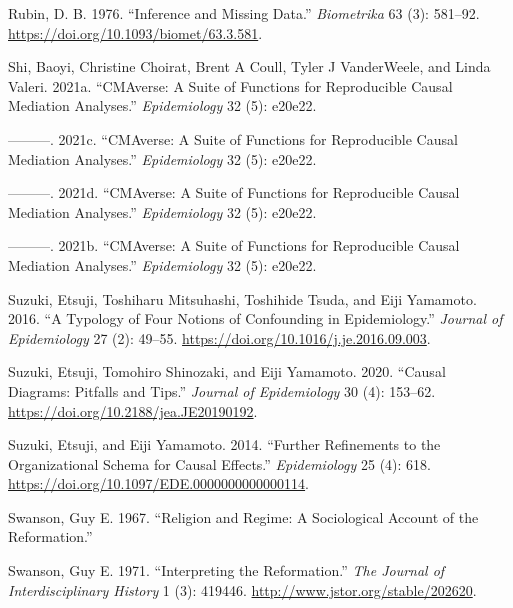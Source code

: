 \documentclass[
  singlecolumn]{report}
\newlength{\cslhangindent}
\newlength{\cslentryspacingunit} %
\newenvironment{CSLReferences}[2] %
 {%
  \setlength{\parindent}{0pt}
  \ifodd #1
  \let\oldpar\par
  \def\par{\hangindent=\cslhangindent\oldpar}
  \fi
  \setlength{\parskip}{#2\cslentryspacingunit}
 }%
 {}
\begin{document}
\begin{CSLReferences}{1}{0}
\leavevmode{}%
Rubin, D. B. 1976. {``Inference and Missing Data.''} \emph{Biometrika}
63 (3): 581--92. \url{https://doi.org/10.1093/biomet/63.3.581}.

\leavevmode{}%
Shi, Baoyi, Christine Choirat, Brent A Coull, Tyler J VanderWeele, and
Linda Valeri. 2021a. {``CMAverse: A Suite of Functions for Reproducible
Causal Mediation Analyses.''} \emph{Epidemiology} 32 (5): e20e22.

\leavevmode{}%
---------. 2021c. {``CMAverse: A Suite of Functions for Reproducible
Causal Mediation Analyses.''} \emph{Epidemiology} 32 (5): e20e22.

\leavevmode{}%
---------. 2021d. {``CMAverse: A Suite of Functions for Reproducible
Causal Mediation Analyses.''} \emph{Epidemiology} 32 (5): e20e22.

\leavevmode{}%
---------. 2021b. {``CMAverse: A Suite of Functions for Reproducible
Causal Mediation Analyses.''} \emph{Epidemiology} 32 (5): e20e22.

\leavevmode{}%
Suzuki, Etsuji, Toshiharu Mitsuhashi, Toshihide Tsuda, and Eiji
Yamamoto. 2016. {``A Typology of Four Notions of Confounding in
Epidemiology.''} \emph{Journal of Epidemiology} 27 (2): 49--55.
\url{https://doi.org/10.1016/j.je.2016.09.003}.

\leavevmode{}%
Suzuki, Etsuji, Tomohiro Shinozaki, and Eiji Yamamoto. 2020. {``Causal
Diagrams: Pitfalls and Tips.''} \emph{Journal of Epidemiology} 30 (4):
153--62. \url{https://doi.org/10.2188/jea.JE20190192}.

\leavevmode{}%
Suzuki, Etsuji, and Eiji Yamamoto. 2014. {``Further Refinements to the
Organizational Schema for Causal Effects.''} \emph{Epidemiology} 25 (4):
618. \url{https://doi.org/10.1097/EDE.0000000000000114}.

\leavevmode{}%
Swanson, Guy E. 1967. {``Religion and Regime: A Sociological Account of
the Reformation.''}

\leavevmode{}%
Swanson, Guy E. 1971. {``Interpreting the Reformation.''} \emph{The
Journal of Interdisciplinary History} 1 (3): 419446.
\url{http://www.jstor.org/stable/202620}.


\end{CSLReferences}
\end{document}
